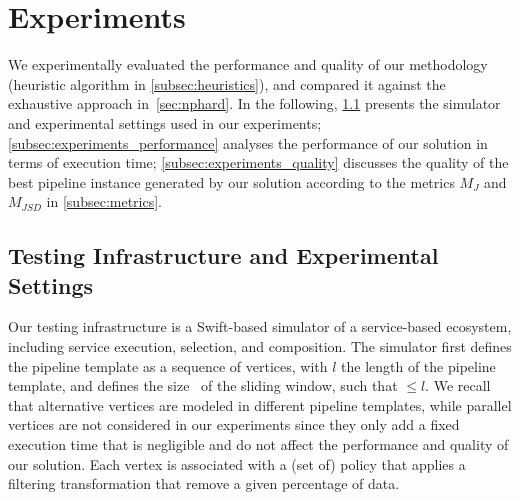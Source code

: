 \section{Experiments}\label{sec:experiment}
We experimentally evaluated the performance and quality of our methodology (heuristic algorithm in \cref{subsec:heuristics}), and compared it against the exhaustive approach in~\cref{sec:nphard}. In the following,
\cref{subsec:experiments_infrastructure} presents the simulator and experimental settings used in our experiments;
\cref{subsec:experiments_performance} analyses the performance of our solution in terms of execution time; \cref{subsec:experiments_quality} discusses the quality of the best pipeline instance generated by our solution according to the metrics $M_J$ and $M_{JSD}$ in \cref{subsec:metrics}.

\subsection{Testing Infrastructure and Experimental Settings}\label{subsec:experiments_infrastructure}
Our testing infrastructure is a Swift-based simulator of a service-based ecosystem, including service execution, selection, and composition.
The simulator first defines the pipeline template as a sequence of vertices, with $l$ the length of the pipeline template, and defines the size \windowsize\ of the sliding window, such that \windowsize$\leq$$l$.
    We recall that alternative vertices are modeled in different pipeline templates, while parallel vertices are not considered in our experiments since they only add a fixed execution time that is negligible and do not affect the performance and quality of our solution.
    Each vertex is associated with a (set of) policy that applies a filtering transformation that remove a given percentage of data.



